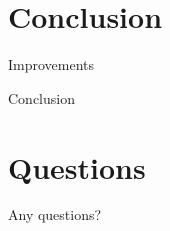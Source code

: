 \documentclass{beamer}
\begin{document}
  \section{Conclusion}
    \begin{frame}{Improvements}
    \end{frame}

    \begin{frame}{Conclusion}
    \end{frame}

  \section{Questions}
    \begin{frame}
      Any questions?
    \end{frame}
\end{document}

